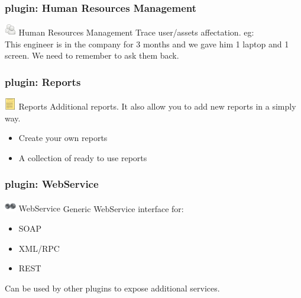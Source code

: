 \documentclass{beamer}
\begin{document}
\begin{frame}
    \frametitle{plugin: Human Resources Management}
    
    \begin{block}{\includegraphics[height=0.5cm]{./pics/plugins/human.jpg} Human Resources Management}
        Trace user/assets affectation. eg: \\ 
        \small{This engineer is in the company for 3 months and we gave him 1 laptop and 1 screen. We need to remember to ask them back.}
    \end{block}

\end{frame}


\begin{frame}
    \frametitle{plugin: Reports}
    
    \begin{block}{\includegraphics[height=0.5cm]{./pics/plugins/reports.jpg} Reports}
        Additional reports. It also allow you to add new reports in a simply way.
        \begin{itemize}
            \item Create your own reports
            \item A collection of ready to use reports
        \end{itemize}
    \end{block}

\end{frame}

\begin{frame}
    \frametitle{plugin: WebService}
    
    \begin{block}{\includegraphics[height=0.5cm]{./pics/plugins/webservice.jpg} WebService}
        Generic WebService interface for:
        \begin{itemize}
            \item SOAP 
            \item XML/RPC
            \item REST
        \end{itemize}
        Can be used by other plugins to expose additional services.
    \end{block}

\end{frame}
\end{document}
